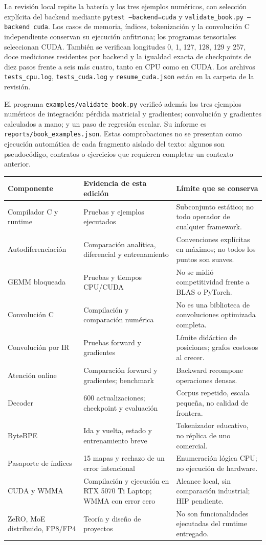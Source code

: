 La revisión local repite la batería y los tres ejemplos numéricos, con selección explícita del backend mediante \texttt{pytest --backend=cuda} y \texttt{validate\_book.py --backend cuda}. Los casos de memoria, índices, tokenización y la convolución C independiente conservan su ejecución anfitriona; los programas tensoriales seleccionan CUDA. También se verifican longitudes 0, 1, 127, 128, 129 y 257, doce mediciones residentes por backend y la igualdad exacta de checkpoints de diez pasos frente a seis más cuatro, tanto en CPU como en CUDA. Los archivos \texttt{tests\_cpu.log}, \texttt{tests\_cuda.log} y \texttt{resume\_cuda.json} están en la carpeta de la revisión.

El programa \texttt{examples/validate\_book.py} verificó además los tres ejemplos numéricos de integración: pérdida matricial y gradientes; convolución y gradientes calculados a mano; y un paso de regresión escalar. Su informe es \texttt{reports/book\_examples.json}. Estas comprobaciones no se presentan como ejecución automática de cada fragmento aislado del texto: algunos son pseudocódigo, contratos o ejercicios que requieren completar un contexto anterior.

\begin{longtable}{@{}P{.27\textwidth}P{.29\textwidth}P{.38\textwidth}@{}}
\toprule
\textbf{Componente} & \textbf{Evidencia de esta edición} & \textbf{Límite que se conserva}\\\midrule\endhead
Compilador C y runtime & Pruebas y ejemplos ejecutados & Subconjunto estático; no todo operador de cualquier framework.\\
Autodiferenciación & Comparación analítica, diferencial y entrenamiento & Convenciones explícitas en máximos; no todos los puntos son suaves.\\
GEMM bloqueada & Pruebas y tiempos CPU/CUDA & No se midió competitividad frente a BLAS o PyTorch.\\
Convolución C & Compilación y comparación numérica & No es una biblioteca de convoluciones optimizada completa.\\
Convolución por IR & Pruebas forward y gradientes & Límite didáctico de posiciones; grafos costosos al crecer.\\
Atención online & Comparación forward y gradientes; benchmark & Backward recompone operaciones densas.\\
Decoder & 600 actualizaciones; checkpoint y evaluación & Corpus repetido, escala pequeña, no calidad de frontera.\\
ByteBPE & Ida y vuelta, estado y entrenamiento breve & Tokenizador educativo, no réplica de uno comercial.\\
Pasaporte de índices & 15 mapas y rechazo de un error intencional & Enumeración lógica CPU; no ejecución de hardware.\\
CUDA y WMMA & Compilación y ejecución en RTX 5070 Ti Laptop; WMMA con error cero & Alcance local, sin comparación industrial; HIP pendiente.\\
ZeRO, MoE distribuido, FP8/FP4 & Teoría y diseño de proyectos & No son funcionalidades ejecutadas del runtime entregado.\\
\bottomrule
\end{longtable}


